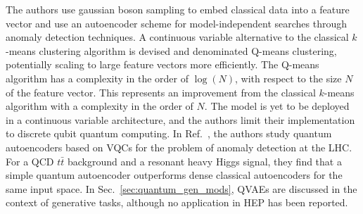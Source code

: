 The authors use gaussian boson sampling to embed classical data into a feature vector and use an autoencoder scheme for model-independent searches through anomaly detection techniques.
A continuous variable alternative to the classical $k$-means clustering algorithm is devised and denominated Q-means clustering, potentially scaling to large feature vectors more efficiently.
The Q-means algorithm has a complexity in the order of $\log(N)$, with respect to the size $N$ of the feature vector.
This represents an improvement from the classical $k$-means algorithm with a complexity in the order of $N$.
The model is yet to be deployed in a continuous variable architecture, and the authors limit their implementation to discrete qubit quantum computing.
%
In Ref.~\cite{2021Ngairangbam}, the authors study quantum autoencoders based on VQCs for the problem of anomaly detection at the LHC.
For a QCD $t\bar{t}$ background and a resonant heavy Higgs signal, they find that a simple quantum autoencoder outperforms dense classical autoencoders for the same input space. 
%
In Sec.~\ref{sec:quantum_gen_mods}, QVAEs are discussed in the context of generative tasks, although no application in HEP has been reported. 
